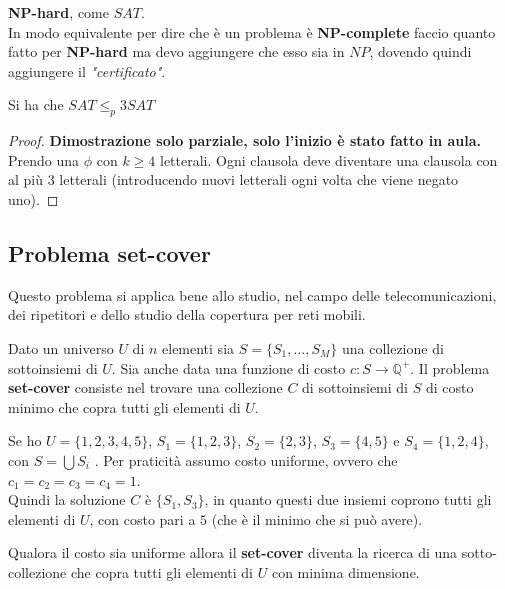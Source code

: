 \textbf{NP-hard}, come $SAT$.\\
In modo equivalente per dire che è un problema è \textbf{NP-complete} faccio
quanto fatto per \textbf{NP-hard} ma devo aggiungere che esso sia in $NP$,
dovendo quindi aggiungere il \textit{"certificato"}.
\begin{teorema}
  Si ha che $SAT\leq_p 3SAT$
\end{teorema}
\begin{proof}
  \textbf{Dimostrazione solo parziale, solo l'inizio è stato fatto in aula.\\}
  Prendo una $\phi$ con $k\geq 4$ letterali. Ogni clausola deve diventare una
  clausola con al più 3 letterali (introducendo nuovi letterali ogni volta che
  viene negato uno). 
\end{proof}
\subsection{Problema set-cover}
Questo problema si applica bene allo studio, nel campo delle telecomunicazioni,
dei ripetitori e dello studio della copertura per reti mobili.
\begin{definizione}
  Dato un universo $U$ di $n$ elementi sia $S=\{S_1,\ldots,S_M\}$ una collezione
  di sottoinsiemi di $U$. Sia anche data una funzione di costo
  $c:S\to\mathbb{Q}^+$. Il problema \textbf{set-cover} consiste nel trovare una
  collezione $C$ di sottoinsiemi di $S$ di costo minimo che copra tutti gli
  elementi di $U$.
\end{definizione}
\begin{esempio}
  Se ho $U=\{1,2,3,4,5\}$, $S_1=\{1,2,3\}$, $S_2=\{2,3\}$, $S_3=\{4,5\}$ e
  $S_4=\{1,2,4\}$, con $S=\bigcup S_i$ . Per praticità assumo costo
  uniforme, ovvero che  $c_1=c_2=c_3=c_4=1$.\\
  Quindi la soluzione $C$ è $\{S_1,S_3\}$, in quanto questi due insiemi coprono
  tutti gli elementi di $U$, con costo pari a $5$ (che è il minimo che si può
  avere).
\end{esempio}
\begin{definizione}
  Qualora il costo sia uniforme allora il \textbf{set-cover} diventa la ricerca
  di una sotto-collezione che copra tutti gli elementi di $U$ con minima
  dimensione.
\end{definizione}

